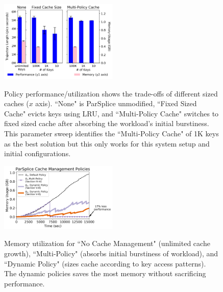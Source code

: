 


\begin{figure}[t]
\noindent\includegraphics[width=0.5\textwidth]{figures/methodology-tradeoff.png}\\
\caption{Policy performance/utilization shows the trade-offs of different sized
caches (\(x\) axis).  ``None" is ParSplice unmodified, ``Fixed Sized Cache"
evicts keys using LRU, and ``Multi-Policy Cache" switches to fixed sized cache
after absorbing the workload's initial burstiness. This parameter sweep
identifies the ``Multi-Policy Cache" of 1K keys as the best solution but this
only works for this system setup and initial configurations.
 \label{fig:methodology-tradeoff}}
\end{figure}

\begin{figure}[t]
        \centering
        \includegraphics[width=0.5\textwidth]{figures/memory-vs-time.png}\\
	\caption{Memory utilization for ``No Cache Management" (unlimited cache
growth), ``Multi-Policy" (absorbs initial burstiness of workload), and
``Dynamic Policy" (sizes cache according to key access patterns). The dynamic
policies saves the most memory without sacrificing performance.
\label{fig:memory-vs-time}}
\end{figure}%
 


